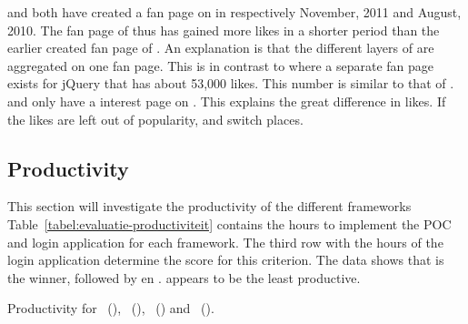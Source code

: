 \documentclass[a4paper]{artikel3}
\begin{document}
\kendob{} and \jqma{} both have created a fan page on \fb{} in respectively November, 2011 and August, 2010.
The fan page of \kendob{} thus has gained more \fb{} likes in a shorter period than the earlier created fan page of \jqma{}.
An explanation is that the different layers of \kendo{} are aggregated on one fan page.
This is in contrast to \jqma{} where a separate fan page exists for jQuery that has about 53,000 likes.
This number is similar to that of \kendo{}.
\sta{} and \lungo{} only have a interest page on \fb.
This explains the great difference in \fb{} likes.
If the likes are left out of popularity, \kendob{} and \jqma{} switch places.


\subsection{Productivity} %
\label{sec:evaluation-productivity}


This section will investigate the productivity of the different frameworks
Table~\ref{tabel:evaluatie-productiviteit} contains the hours to implement the POC and login application for each framework.
The third row with the hours of the login application determine the score for this criterion.
The data shows that \jqma{} is the winner,  followed by \lungo{} en \kendob{}.
\sta{} appears to be the least productive.

\begin{table}[t]
\centering
{}
\caption{Productivity for \st{}~(\sta), \kendo{}~(\kendob), \jqm{}~(\jqma) and \lungo{}~(\lungoa).}
\label{tabel:evaluatie-productiviteit}
\end{table}
\end{document}
